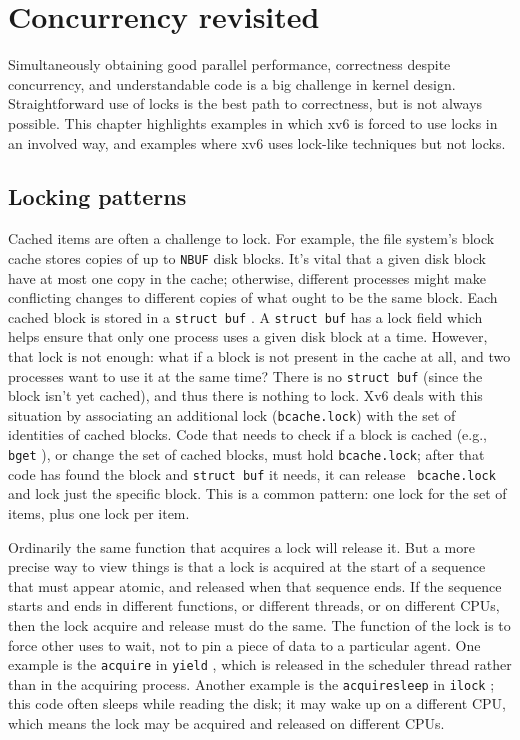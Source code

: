 \chapter{Concurrency revisited}
\label{CH:LOCK2}

Simultaneously obtaining good parallel
performance, correctness despite concurrency, and understandable code
is a big challenge in kernel design.
Straightforward use of locks is the best path to correctness,
but is not always possible.
This
chapter highlights examples in which xv6 is forced to use locks in an
involved way, and examples where xv6 uses lock-like techniques but not
locks.

\section{Locking patterns}

Cached items are often a challenge to lock.
For example,
the file system's block cache  stores
copies of up to {\tt NBUF} disk blocks.
It's vital that a given disk block have at most
one copy in the cache; otherwise, different processes might make
conflicting changes to different copies of what ought to be the same
block. Each cached block is stored in a {\tt struct buf}
. A {\tt struct buf} has a lock field which
helps ensure that only one process uses a given disk block at a time.
However, that lock is not enough: what if a block is not present in
the cache at all, and two processes want to use it at the same time?
There is no {\tt struct buf} (since the block isn't yet cached), and
thus there is nothing to lock. Xv6 deals with this situation by
associating an additional lock ({\tt bcache.lock}) with the set of
identities of cached blocks. Code that needs to check if a block is
cached (e.g., {\tt bget} ), or change the
set of cached blocks, must hold {\tt bcache.lock}; after that code has
found the block and {\tt struct buf} it needs, it can release {\tt
  bcache.lock} and lock just the specific block. This is a common
pattern: one lock for the set of items, plus one lock per item.

Ordinarily the same function that acquires a lock will release it. But
a more precise way to view things is that a lock is acquired at the
start of a sequence that must appear atomic, and released when that
sequence ends. If the sequence starts and ends in different functions,
or different threads, or on different CPUs, then the lock acquire and
release must do the same. The function of the lock is to force
other uses to wait, not to pin a piece of data to a particular agent. One
example is the {\tt acquire} in {\tt yield}
, which is released in the scheduler
thread rather than in the acquiring process. Another example is the
{\tt acquiresleep} in {\tt ilock} ; this
code often sleeps while reading the disk; it may wake up on a
different CPU, which means the lock may be acquired
and released on different CPUs.

